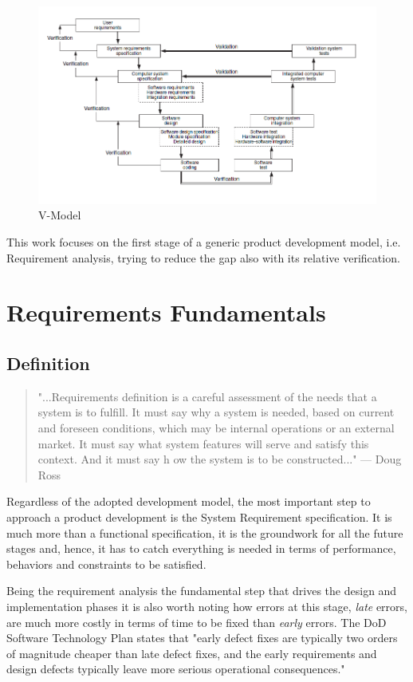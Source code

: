 \begin{figure}[!h]
	\centering 
     \includegraphics[width=\textwidth]{Figs/vmodel.png} 
     \caption{V-Model} 
     \label{fig:vmodel} 
\end{figure} 

This work focuses on the first stage of a generic product development model, i.e. Requirement analysis, trying to reduce the gap also with its relative verification.

\section{Requirements Fundamentals}
\subsection{Definition}
\begin{quote}
"...Requirements definition is a careful assessment of the needs that a system is to fulfill. It must say why a
system is needed, based on current and foreseen conditions, which may be internal operations or an external market. It must say what system features will serve and satisfy this context. And it must say h ow the
system is to be constructed..." — Doug Ross \citep{ross1977structured}
\end{quote}
Regardless of the adopted development model, the most important step to approach a product development is the System Requirement specification. It is much more than a functional specification, it is the groundwork for all the future stages and, hence, it has to catch everything is needed in terms of performance, behaviors and constraints to be satisfied. 
\par Being the requirement analysis the fundamental step that drives the design and implementation phases it is also worth noting how errors at this stage, \textit{late} errors, are much more costly in terms of time to be fixed than \textit{early} errors. The DoD Software Technology Plan \citep{DoD91} states that "early defect fixes are typically two orders of magnitude cheaper than late defect fixes, and the early requirements and design defects typically leave more serious operational consequences."

